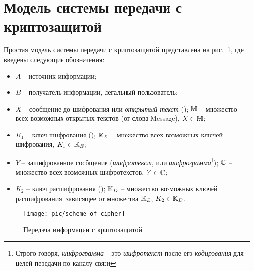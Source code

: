 \section{Модель системы передачи с криптозащитой}

Простая модель системы передачи с криптозащитой представлена на рис.~\ref{pic:Encrypt}, где введены следующие обозначения:
\begin{itemize}
    \item $A$ -- источник информации;
    \item $B$ -- получатель информации, легальный пользователь;
    \item $X$ -- сообщение до шифрования или \emph{открытый текст} (); $\mathbb{M}$ -- множество всех возможных открытых текстов (от слова Message), $X \in \mathbb{M}$;
    \item $K_1$ -- ключ шифрования (); $\mathbb{K}_E$ -- множество всех возможных ключей шифрования, $K_1 \in \mathbb{K}_E$;
    \item $Y$ -- зашифрованное сообщение (\emph{шифротекст},  или \emph{шифрограмма}\footnote{Строго говоря, \emph{шифрограмма} -- это \emph{шифротекст} после его \emph{кодирования} для целей передачи по каналу связи}); $\mathbb{C}$ -- множество всех возможных шифротекстов, $Y \in \mathbb{C}$;
    \item $K_2$ -- ключ расшифрования (); $\mathbb{K}_D$  -- множество возможных ключей расшифрования, зависящее от множества $\mathbb{K}_E$, $K_2 \in \mathbb{K}_D$.
\end{itemize}

\begin{figure}[!thb]
	\centering
	\texttt{[image: pic/scheme-of-cipher]}
	\caption{Передача информации с криптозащитой\label{pic:Encrypt}}
\end{figure}

